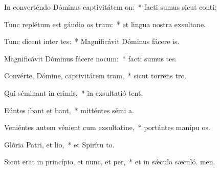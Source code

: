 \item In converténdo Dóminus captivitátem on:~* facti sumus sicut conti:
\item Tunc replétum est gáudio os trum:~* et lingua nostra exsultane.
\item Tunc dicent inter tes:~* Magnificávit Dóminus fácere  is.
\item Magnificávit Dóminus fácere nocum:~* facti sumus tes.
\item Convérte, Dómine, captivitátem tram,~* sicut torrens  tro.
\item Qui séminant in crimis,~* in exsultatió tent.
\item Eúntes ibant et bant,~* mitténtes sémi a.
\item Veniéntes autem vénient cum exsultatine,~* portántes manípu os.
\item Glória Patri, et lio,~* et Spirítu to.
\item Sicut erat in princípio, et nunc, et per,~* et in sǽcula sæculó. men.
